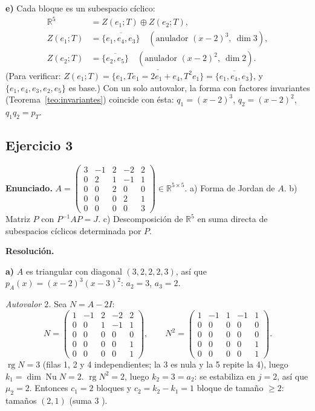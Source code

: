\documentclass{article}
\newcommand{\R}{\mathbb{R}}
\DeclareMathOperator{\rg}{rg}
\newcommand{\gen}[1]{\overline{\{#1\}}}          %
\DeclareMathOperator{\Nu}{Nu}
\theoremstyle{plain}
\theoremstyle{definition}
\theoremstyle{remark}
\begin{document}
\textbf{e)} Cada bloque es un subespacio cíclico:
\begin{align*}
    \R^5     & =Z(e_1;T)\oplus Z(e_2;T),                                 \\
    Z(e_1;T) & =\gen{e_1,e_4,e_3}\quad(\text{anulador }(x-2)^3,\ \dim3), \\
    Z(e_2;T) & =\gen{e_2,e_5}\quad(\text{anulador }(x-2)^2,\ \dim2).
\end{align*}
(Para verificar: \(Z(e_1;T)=\gen{e_1,Te_1=2e_1+e_4,T^2e_1}=\gen{e_1,e_4,e_3}\), y \(\{e_1,e_4,e_3,e_2,e_5\}\) es base.) Con un solo autovalor, la forma con factores invariantes (Teorema~\ref{teo:invariantes}) coincide con ésta: \(q_1=(x-2)^3\), \(q_2=(x-2)^2\), \(q_1q_2=p_T\).

\subsection{Ejercicio 3}
\textbf{Enunciado.} \(A=\begin{pmatrix}3&-1&2&-2&2\\0&2&1&-1&1\\0&0&2&0&0\\0&0&0&2&1\\0&0&0&0&3\end{pmatrix}\in\R^{5\times5}\).
a) Forma de Jordan de \(A\). b) Matriz \(P\) con \(P^{-1}AP=J\). c) Descomposición de \(\R^5\) en suma directa de subespacios cíclicos determinada por \(P\).

\textbf{Resolución.}

\textbf{a)} \(A\) es triangular con diagonal \((3,2,2,2,3)\), así que \(p_A(x)=(x-2)^3(x-3)^2\): \(a_2=3\), \(a_3=2\).

\emph{Autovalor \(2\).} Sea \(N=A-2I\):
\[
    N=\begin{pmatrix}1&-1&2&-2&2\\0&0&1&-1&1\\0&0&0&0&0\\0&0&0&0&1\\0&0&0&0&1\end{pmatrix},\qquad
    N^2=\begin{pmatrix}1&-1&1&-1&1\\0&0&0&0&0\\0&0&0&0&0\\0&0&0&0&1\\0&0&0&0&1\end{pmatrix}.
\]
\(\rg N=3\) (filas 1, 2 y 4 independientes; la 3 es nula y la 5 repite la 4), luego \(k_1=\dim\Nu N=2\). \(\rg N^2=2\), luego \(k_2=3=a_2\): se estabiliza en \(j=2\), así que \(\mu_2=2\). Entonces \(c_1=2\) bloques y \(c_2=k_2-k_1=1\) bloque de tamaño \(\ge2\): tamaños \((2,1)\) (suma \(3\) \checkmark).
\end{document}
